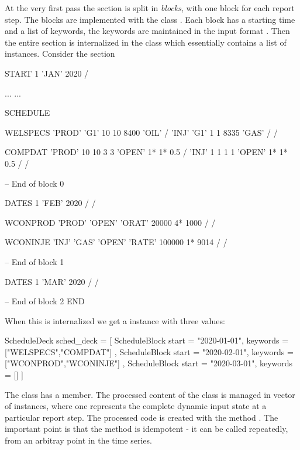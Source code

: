 At the very first pass the  section is split in \emph{blocks}, with
one block for each report step. The blocks are implemented with the class
. Each block has a starting time and a list of
keywords, the keywords are maintained in the input format
. Then the entire  section is internalized
in the class  which essentially contains a list of
 instances. Consider the  section
\begin{deck}
START
  1 'JAN' 2020 /

...
...

SCHEDULE

WELSPECS
	'PROD'	'G1'	10	10	8400	'OIL' /
	'INJ'	'G1'	1	1	8335	'GAS' /
/

COMPDAT
	'PROD'	10	10	3	3	'OPEN'	1*	1*	0.5 /
	'INJ'	1	1	1	1	'OPEN'	1*	1*	0.5 /
/

-- End of block 0

DATES
   1 'FEB' 2020 /
/

WCONPROD
	'PROD' 'OPEN' 'ORAT' 20000 4* 1000 /
/

WCONINJE
	'INJ'	'GAS'	'OPEN'	'RATE'	100000 1* 9014 /
/

-- End of block 1

DATES
  1 'MAR' 2020 /
/

-- End of block 2
END

\end{deck}

When this is internalized we get a  instance with three
 values:

\begin{code}
ScheduleDeck sched_deck = [
  ScheduleBlock {
    start = "2020-01-01",
    keywords = ["WELSPECS","COMPDAT"]
  },
  ScheduleBlock {
    start = "2020-02-01",
    keywords = ["WCONPROD","WCONINJE"]
  },
  ScheduleBlock {
    start = "2020-03-01",
    keywords = []
  }
]
\end{code}

The  class has a  member. The
processed content of the  class is managed in vector of
 instances, where one 
represents the complete dynamic input state at a particular report step. The
processed  code is created with the method
. The important point is that the
 method is idempotent - it can be
called repeatedly, from an arbitray point in the time series.

